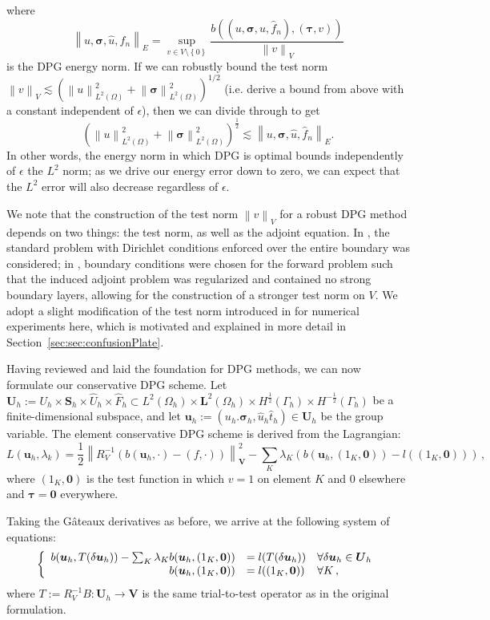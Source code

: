 \documentclass[letterpaper]{article}
\def\btau{\boldsymbol\tau}
\def\bftau{\boldsymbol\tau}
\def\bfsigma{\boldsymbol\sigma}
\newcommand{\bs}[1]{\boldsymbol{#1}}
\newcommand{\secref}[1]{\ref{sec:#1}}
\newcommand{\norm}[1]{\left\| #1 \right\|}
\newcommand{\LRp}[1]{\left( #1 \right)}
\newcommand{\LRc}[1]{\left\{ #1 \right\}}
\newcommand{\uh}{\widehat{u}}
\newcommand{\fnh}{\widehat{f}_n}
\renewcommand{\L}{L^2\LRp{\Omega}}
\begin{document}
where
\[
\norm{u,\bfsigma,\uh,\fnh}_E = \sup_{v\in
V\setminus\LRc{0}}\frac{b\LRp{\LRp{u,\bfsigma,\uh,\fnh},\LRp{\bftau,v}}}{\norm{v}_V}
\]
is the DPG energy norm.  If we can robustly bound the test norm $\norm{v}_V
\lesssim \LRp{\norm{u}_{\L}^2+\norm{\bfsigma}^2_{\L}}^{1/2}$ (i.e. derive a
bound from above with a constant independent of $\epsilon$), then we can
divide through to get
\begin{equation}
\LRp{\norm{u}_{\L}^2 + \norm{\bfsigma}_{\L}^2}^{\frac{1}{2}} \lesssim
\norm{u,\bfsigma,\uh,\fnh}_E.
\label{eq:robustBound}
\end{equation}
In other words, the energy norm in which DPG is optimal bounds independently
of $\epsilon$ the $L^2$ norm; as we drive our energy error down to zero, we
can expect that the $L^2$ error will also decrease regardless of $\epsilon$.

We note that the construction of the test norm $\norm{v}_V$ for a robust DPG
method depends on two things: the test norm, as well as the adjoint equation.
In \cite{DemkowiczHeuer}, the standard problem with Dirichlet conditions
enforced over the entire boundary was considered; in
\cite{ChanHeuerThanhDemkowicz2012}, boundary conditions were chosen for the
forward problem such that the induced adjoint problem was regularized and
contained no strong boundary layers, allowing for the construction of a
stronger test norm on $V$.  We adopt a slight modification of the test norm
introduced in \cite{ChanHeuerThanhDemkowicz2012} for numerical experiments
here, which is motivated and explained in more detail in
Section~\secref{sec:confusionPlate}.


Having reviewed and laid the foundation for DPG methods, we can now formulate our conservative DPG scheme.  %
Let $\bs U_h:=U_h\times\bs S_h\times\hat U_h\times\hat F_h\subset L^2(\Omega_h)\times\bs
L^2(\Omega_h)\times H^{\frac{1}{2}}(\Gamma_h)\times H^{-\frac{1}{2}}(\Gamma_h)$
be a finite-dimensional subspace, and let $\bs u_h:=(u_h.\bfsigma_h,\hat
u_h\hat t_h)\in\bs U_h$ be the group variable. The element conservative DPG scheme is
derived from the Lagrangian:
\begin{equation}
L(\bs u_h,\lambda_k)=\frac{1}{2}\norm{R_V^{-1}(b(\bs
u_h,\cdot)-(f,\cdot))}^2_{\bs V}-\sum_K\lambda_K(b(\bs u_h,(1_K,\bs0))-l((1_K,\bs0)))\,,
\label{eq:lagrangian}
\end{equation}
where $(1_K,\bs0)$ is the test function in which $v=1$ on element $K$ and 0 elsewhere and $\btau=\bs0$ everywhere.

Taking the G\^ateaux derivatives as before, we arrive at the following system
of equations:
\begin{equation}
\left\{
\begin{array}[c]{rll}
b(\bs u_h,T(\delta\bs u_h))-\sum_K\lambda_K b(\bs u_h,(1_K,\bs0))
&=l(T(\delta\bs u_h)) & \forall\delta\bs u_h\in\bs U_h\\
b(\bs u_h,(1_K,\bs0)) &=l((1_K,\bs0)) & \forall K\,,
\end{array}
\right.
\label{eq:conservativeSystem}
\end{equation}
where $T:=R_V^{-1}B:\bs U_h\rightarrow\bs V$ is the same trial-to-test operator as in the original formulation.
\end{document}
